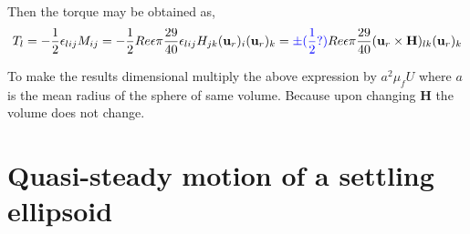 \documentclass[12pt]{My_preprint}
\begin{document}
Then the torque may be obtained as, 
\begin{equation}
    T_l = - \frac{1}{2}\epsilon_{lij}M_{ij}
    =- \frac{1}{2} Re \epsilon \pi 
    \frac{29}{40} \epsilon_{lij}H_{jk}(\textbf{u}_r)_i  (\textbf{u}_r)_k
    =\color{blue}\pm(\frac{1}{2} ?)\color{black} Re \epsilon \pi 
    \frac{29}{40} (\textbf{u}_r\times \textbf{H})_{lk}  (\textbf{u}_r)_k
\end{equation}

To make the results dimensional multiply the above expression by $a^2 \mu_f U$ where $a$ is the mean radius of the sphere of same volume. Because upon changing $\textbf{H}$ the volume does not change. 

\section{Quasi-steady motion of a settling ellipsoid}
\end{document}
